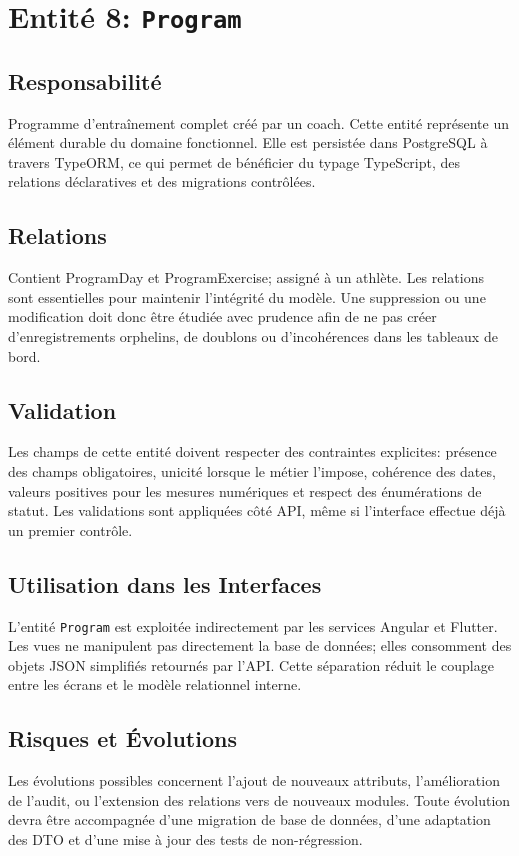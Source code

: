 \section{Entité 8: \texttt{Program}}
\subsection{Responsabilité}
Programme d’entraînement complet créé par un coach. Cette entité représente un élément durable du domaine fonctionnel. Elle est persistée dans PostgreSQL à travers TypeORM, ce qui permet de bénéficier du typage TypeScript, des relations déclaratives et des migrations contrôlées.

\subsection{Relations}
Contient ProgramDay et ProgramExercise; assigné à un athlète. Les relations sont essentielles pour maintenir l'intégrité du modèle. Une suppression ou une modification doit donc être étudiée avec prudence afin de ne pas créer d'enregistrements orphelins, de doublons ou d'incohérences dans les tableaux de bord.

\subsection{Validation}
Les champs de cette entité doivent respecter des contraintes explicites: présence des champs obligatoires, unicité lorsque le métier l'impose, cohérence des dates, valeurs positives pour les mesures numériques et respect des énumérations de statut. Les validations sont appliquées côté API, même si l'interface effectue déjà un premier contrôle.

\subsection{Utilisation dans les Interfaces}
L'entité \texttt{Program} est exploitée indirectement par les services Angular et Flutter. Les vues ne manipulent pas directement la base de données; elles consomment des objets JSON simplifiés retournés par l'API. Cette séparation réduit le couplage entre les écrans et le modèle relationnel interne.

\subsection{Risques et Évolutions}
Les évolutions possibles concernent l'ajout de nouveaux attributs, l'amélioration de l'audit, ou l'extension des relations vers de nouveaux modules. Toute évolution devra être accompagnée d'une migration de base de données, d'une adaptation des DTO et d'une mise à jour des tests de non-régression.

